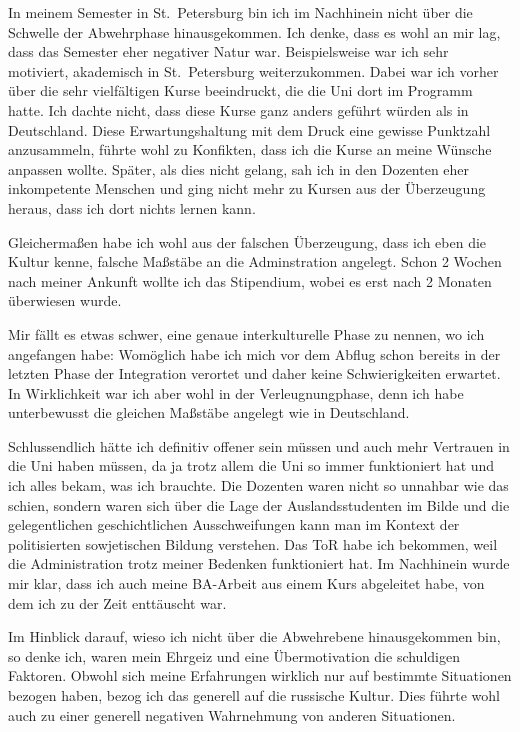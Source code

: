 \documentclass[12pt,headsepline,a4paper]{scrartcl}
\begin{document}
In meinem Semester in St.\ Petersburg bin ich im Nachhinein nicht über die Schwelle der Abwehrphase hinausgekommen. Ich denke, dass es wohl an mir lag, dass das Semester eher negativer Natur war. Beispielsweise war ich sehr motiviert, akademisch in St.\ Petersburg weiterzukommen. Dabei war ich vorher über die sehr vielfältigen Kurse beeindruckt, die die Uni dort im Programm hatte. Ich dachte nicht, dass diese Kurse ganz anders geführt würden als in Deutschland. Diese Erwartungshaltung mit dem Druck eine gewisse Punktzahl anzusammeln, führte wohl zu Konfikten, dass ich die Kurse an meine Wünsche anpassen wollte. Später, als dies nicht gelang, sah ich in den Dozenten eher inkompetente Menschen und ging nicht mehr zu Kursen aus der Überzeugung heraus, dass ich dort nichts lernen kann.

Gleichermaßen habe ich wohl aus der falschen Überzeugung, dass ich eben die Kultur kenne, falsche Maßstäbe an die Adminstration angelegt. Schon 2 Wochen nach meiner Ankunft wollte ich das Stipendium, wobei es erst nach 2 Monaten überwiesen wurde.

Mir fällt es etwas schwer, eine genaue interkulturelle Phase zu nennen, wo ich angefangen habe: Womöglich habe ich mich vor dem Abflug schon bereits in der letzten Phase der Integration verortet  und daher keine Schwierigkeiten erwartet. In Wirklichkeit war ich aber wohl in der Verleugnungphase, denn ich habe unterbewusst die gleichen Maßstäbe angelegt wie in Deutschland. 

Schlussendlich hätte ich definitiv offener sein müssen und auch mehr Vertrauen in die Uni haben müssen, da ja trotz allem die Uni so immer funktioniert hat und ich alles bekam, was ich brauchte. Die Dozenten waren nicht so unnahbar wie das schien, sondern waren sich über die Lage der Auslandsstudenten im Bilde und die gelegentlichen geschichtlichen Ausschweifungen kann man im Kontext der politisierten sowjetischen Bildung verstehen. Das ToR habe ich bekommen, weil die Administration trotz meiner Bedenken funktioniert hat. Im Nachhinein wurde mir klar, dass ich auch meine BA-Arbeit aus einem Kurs abgeleitet habe, von dem ich zu der Zeit enttäuscht war.

Im Hinblick darauf, wieso ich nicht über die Abwehrebene hinausgekommen bin, so denke ich, waren mein Ehrgeiz und eine Übermotivation die schuldigen Faktoren. Obwohl sich meine Erfahrungen wirklich nur auf bestimmte Situationen bezogen haben, bezog ich das generell auf die russische Kultur. Dies führte wohl auch zu einer generell negativen Wahrnehmung von anderen Situationen.
\end{document}
